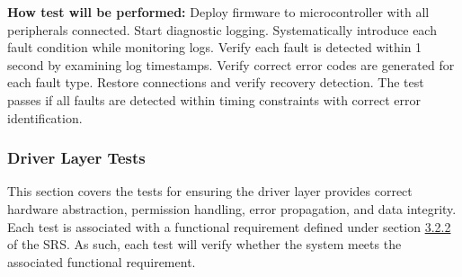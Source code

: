 \documentclass[12pt, titlepage]{article}
\begin{document}
\begin{enumerate}
\textbf{How test will be performed:}
Deploy firmware to microcontroller with all peripherals connected. Start diagnostic 
logging. Systematically introduce each fault condition while monitoring logs. 
Verify each fault is detected within 1 second by examining log timestamps. 
Verify correct error codes are generated for each fault type. Restore connections 
and verify recovery detection. The test passes if all faults are detected within 
timing constraints with correct error identification.

\end{enumerate}

\subsubsection{Driver Layer Tests}

This section covers the tests for ensuring the driver layer provides correct 
hardware abstraction, permission handling, error propagation, and data integrity. 
Each test is associated with a functional requirement defined under section 
\hyperref[SRS-sec:FR2]{3.2.2} of the SRS. As such, each test will verify whether 
the system meets the associated functional requirement.
\end{document}
